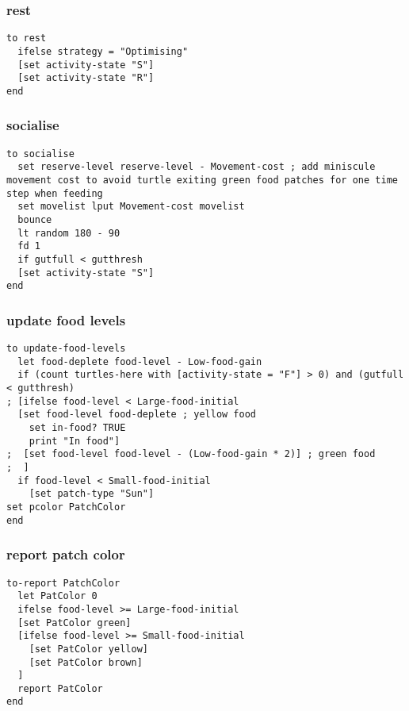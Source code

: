 \documentclass[]{article}
\begin{document}
\subsubsection{rest}\label{rest}

\begin{verbatim}
to rest
  ifelse strategy = "Optimising"
  [set activity-state "S"]
  [set activity-state "R"]
end
\end{verbatim}

\subsubsection{socialise}\label{socialise}

\begin{verbatim}
to socialise
  set reserve-level reserve-level - Movement-cost ; add miniscule movement cost to avoid turtle exiting green food patches for one time step when feeding
  set movelist lput Movement-cost movelist
  bounce
  lt random 180 - 90
  fd 1
  if gutfull < gutthresh
  [set activity-state "S"]
end
\end{verbatim}

\subsubsection{update food levels}\label{update-food-levels}

\begin{verbatim}
to update-food-levels
  let food-deplete food-level - Low-food-gain
  if (count turtles-here with [activity-state = "F"] > 0) and (gutfull < gutthresh)
; [ifelse food-level < Large-food-initial
  [set food-level food-deplete ; yellow food
    set in-food? TRUE
    print "In food"]
;  [set food-level food-level - (Low-food-gain * 2)] ; green food
;  ]
  if food-level < Small-food-initial
    [set patch-type "Sun"]
set pcolor PatchColor
end
\end{verbatim}

\subsubsection{report patch color}\label{report-patch-color}

\begin{verbatim}
to-report PatchColor
  let PatColor 0
  ifelse food-level >= Large-food-initial
  [set PatColor green]
  [ifelse food-level >= Small-food-initial
    [set PatColor yellow]
    [set PatColor brown]
  ]
  report PatColor
end
\end{verbatim}
\end{document}
